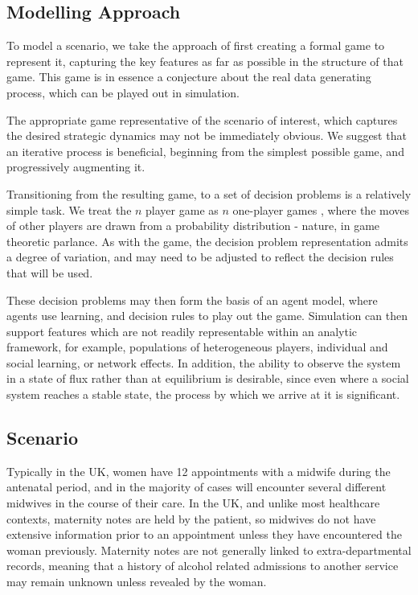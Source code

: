 \documentclass[graybox]{svmult}
\begin{document}
\subsection{Modelling Approach}
\label{sec:model_design}

To model a scenario, we take the approach of first creating a formal game to represent it, capturing the key features as far as possible in the structure of that game. This game is in essence a conjecture about the real data generating process, which can be played out in simulation.

The appropriate game representative of the scenario of interest, which captures the desired strategic dynamics may not be immediately obvious. We suggest that an iterative process is beneficial, beginning from the simplest possible game, and progressively augmenting it.

Transitioning from the resulting game, to a set of decision problems is a relatively simple task. We treat the $n$ player game as $n$ one-player games \citep{RiosInsua2009}, where the moves of other players are drawn from a probability distribution - nature, in game theoretic parlance. As with the game, the decision problem representation admits a degree of variation, and may need to be adjusted to reflect the decision rules that will be used.

These decision problems may then form the basis of an agent model, where agents use learning, and decision rules to play out the game. Simulation can then support features which are not readily representable within an analytic framework, for example, populations of heterogeneous players, individual and social learning, or network effects. In addition, the ability to observe the system in a state of flux rather than at equilibrium is desirable, since even where a social system reaches a stable state, the process by which we arrive at it is significant. 

\subsection{Scenario}
\label{sec:scenario}

Typically in the UK, women have 12 appointments with a midwife during the antenatal period, and in the majority of cases will encounter several different midwives \citep{Redshaw2014} in the course of their care. In the UK, and unlike most healthcare contexts, maternity notes are held by the patient, so midwives do not have extensive information prior to an appointment unless they have encountered the woman previously. Maternity notes are not generally linked to extra-departmental records, meaning that a history of alcohol related admissions to another service may remain unknown unless revealed by the woman.
\end{document}
